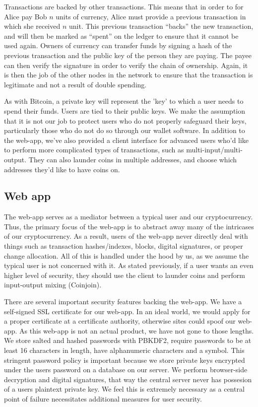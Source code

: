 \documentclass[12pt]{article}
\begin{document}
Transactions are backed by other transactions. This means that in order to for Alice pay Bob $n$ units of currency, Alice must provide a previous transaction in which she received $n$ unit. This previous transaction ``backs'' the new transaction, and will then be marked as ``spent'' on the ledger to ensure that it cannot be used again. Owners of currency can transfer funds by signing a hash of the previous transaction and the public key of the person they are paying. The payee can then verify the signature in order to verify the chain of ownership. Again, it is then the job of the other nodes in the network to ensure that the transaction is legitimate and not a result of double spending.

As with Bitcoin, a private key will represent the 'key' to which a user needs to spend their funds. Users are tied to their public keys. We make the assumption that it is not our job to protect users who do not properly safeguard their keys, particularly those who do not do so through our wallet software. In addition to the web-app, we've also provided a client interface for advanced users who'd like to perform more complicated types of transactions, such as multi-input/multi-output. They can also launder coins in multiple addresses, and choose which addresses they'd like to have coins on.

\subsection*{Web app}

The web-app serves as a mediator between a typical user and our cryptocurrency. Thus, the primary focus of the web-app is to abstract away many of the intricases of our cryptocurrency. As a result, users of the web-app never directly deal with things such as transaction hashes/indexes, blocks, digital signatures, or proper change allocation. All of this is handled under the hood by us, as we assume the typical user is not concerned with it. As stated previously, if a user wants an even higher level of security, they should use the client to launder coins and perform input-output mixing (Coinjoin).

There are several important security features backing the web-app. We have a self-signed SSL certificate for our web-app. In an ideal world, we would apply for a proper certificate at a certificate authority, otherwise sites could spoof our web-app. As this web-app is not an actual product, we have not gone to those lengths. We store salted and hashed passwords with PBKDF2, require passwords to be at least 16 characters in length, have alphanumeric characters and a symbol. This stringent password policy is important because we store private keys encrypted under the users password on a database on our server. We perform browser-side decryption and digital signatures, that way the central server never has possesion of a users plaintext private key. We feel this is extremely necessary as a central point of failure necessitates additional measures for user security.
\end{document}
